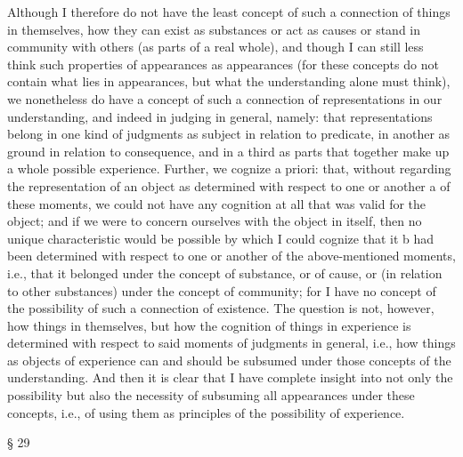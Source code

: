 Although I therefore do not have the least concept of such a connection
of things in themselves, how they can exist as substances or act as causes
or stand in community with others (as parts of a real whole), and though
I can still less think such properties of appearances as appearances (for
these concepts do not contain what lies in appearances, but what the
understanding alone must think), we nonetheless do have a concept of
such a connection of representations in our understanding, and indeed
in judging in general, namely: that representations belong in one kind
of judgments as subject in relation to predicate, in another as ground in
relation to consequence, and in a third as parts that together make up
a whole possible experience. Further, we cognize a priori: that, without
regarding the representation of an object as determined with respect to
one or another a of these moments, we could not have any cognition at
all that was valid for the object; and if we were to concern ourselves with
the object in itself, then no unique characteristic would be possible by
which I could cognize that it b had been determined with respect to one
or another of the above-mentioned moments, i.e., that it belonged under
the concept of substance, or of cause, or (in relation to other substances)
under the concept of community; for I have no concept of the possibility
of such a connection of existence. The question is not, however, how
things in themselves, but how the cognition of things in experience is
determined with respect to said moments of judgments in general, i.e.,
how things as objects of experience can and should be subsumed under
those concepts of the understanding. And then it is clear that I have
complete insight into not only the possibility but also the necessity of
subsuming all appearances under these concepts, i.e., of using them as
principles of the possibility of experience.

§ 29

